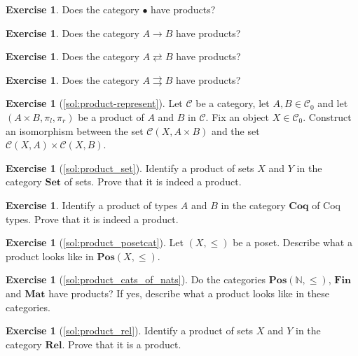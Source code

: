 \documentclass[a4paper,11pt, oneside,titlepage=false]{scrbook}
\theoremstyle{plain}
\theoremstyle{definition}
\newtheorem{exer}[thm]{Exercise}
\newcommand{\Cat}[1]{\mathcal{#1}}
\newcommand{\CC}{\Cat{C}}
\newcommand{\Catb}[1]{\mathbf{#1}}
\newcommand{\SET}{\Catb{Set}}
\newcommand{\POS}{\Catb{Pos}}
\newcommand{\COQ}{\Catb{Coq}}
\newcommand{\MAT}{\Catb{Mat}}
\newcommand{\SKELFINSET}{\Catb{Fin}}
\newcommand{\REL}{\Catb{Rel}}
\newcommand{\Ob}[1]{{#1}_0}
\newcommand{\projl}{\ensuremath{\pi_l}}
\newcommand{\projr}{\ensuremath{\pi_r}}
\newcommand{\NN}{\ensuremath{\mathbb{N}}}
\begin{document}
\begin{exer}
  Does the category $\bullet$ have products?
\end{exer}

\begin{exer}
  Does the category $A \to B$ have products?
\end{exer}

\begin{exer}
  Does the category $A \rightleftarrows B$ have products?
\end{exer}

\begin{exer}
  Does the category $A \rightrightarrows B$ have products?
\end{exer}

\begin{exer}[\cref{sol:product-represent}]\label{exer:product-represent}
  Let $\CC$ be a category, let $A,B\in\Ob{\CC}$ and let $(A\times B,\projl,\projr)$ be a product of $A$ and $B$ in $\CC$. Fix an object $X\in\Ob{\CC}$. Construct an isomorphism between the set $\CC(X, A\times B)$ and the set $\CC(X,A)\times\CC(X,B)$.  
\end{exer}

\begin{exer}[\cref{sol:product_set}]\label{exer:product_set}
  Identify a product of sets $X$ and $Y$ in the category $\SET$ of sets.
  Prove that it is indeed a product.
\end{exer}

\begin{exer}
  Identify a product of types $A$ and $B$ in the category $\COQ$ of Coq types.
  Prove that it is indeed a product.
\end{exer}

\begin{exer}[\cref{sol:product_posetcat}]\label{exer:product_posetcat}
  Let $(X,\leq)$ be a poset. Describe what a product looks like in  $\POS(X,\leq)$.
\end{exer}

\begin{exer}[\cref{sol:product_cats_of_nats}]\label{exer:product_cats_of_nats}
  Do the categories $\POS(\NN, \leq)$, $\SKELFINSET$ and $\MAT$ have products? If yes, describe what a product looks like in these categories. 
\end{exer}

\begin{exer}[\cref{sol:product_rel}] \label{exer:product_rel}
  Identify a product of sets $X$ and $Y$ in the category $\REL$. Prove that it is a product. 
\end{exer}
\end{document}
